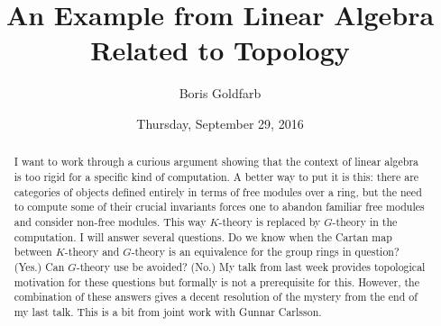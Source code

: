 \documentclass{UAmathtalk}
\author{Boris Goldfarb}
\title{An Example from Linear Algebra\\ Related to Topology}
\date{Thursday, September 29, 2016}
\begin{document}
\maketitle

\begin{abstract}
I want to work through a curious argument showing that the context of linear algebra is too rigid for a specific kind of computation. A better way to put it is this: there are categories of objects defined entirely in terms of free modules over a ring, but the need to compute some of their crucial invariants forces one to abandon familiar free modules and consider non-free modules. This way $K$-theory is replaced by $G$-theory in the computation. I will answer several questions.  Do we know when the Cartan map between $K$-theory and $G$-theory is an equivalence for the group rings in question?  (Yes.) Can $G$-theory use be avoided?  (No.)  My talk from last week provides topological motivation for these questions but formally is not a prerequisite for this. However, the combination of these answers gives a decent resolution of the mystery from the end of my last talk. This is a bit from joint work with Gunnar Carlsson.
\end{abstract}
\end{document}
